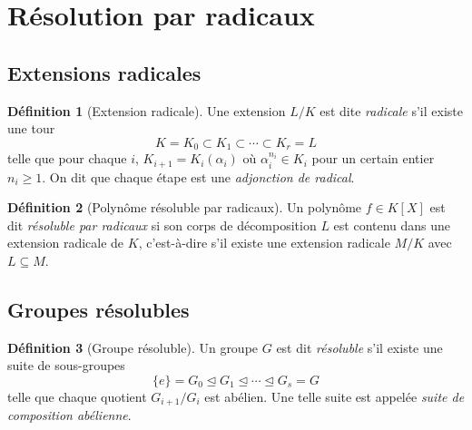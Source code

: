 \documentclass[12pt,a4paper,openany]{book}
\theoremstyle{definition}
\newtheorem{definition}{Définition}[chapter]
\begin{document}
\section{Résolution par radicaux}\label{sec:resolution-radicaux}

\subsection{Extensions radicales}\label{ssec:extensions-radicales}

\begin{definition}[Extension radicale]\label{def:extension-radicale}
Une extension $L/K$ est dite \emph{radicale} s'il existe une tour
\[
  K = K_0 \subset K_1 \subset \cdots \subset K_r = L
\]
telle que pour chaque $i$, $K_{i+1} = K_i(\alpha_i)$ où $\alpha_i^{n_i}
\in K_i$ pour un certain entier $n_i \geq 1$. On dit que chaque étape est
une \emph{adjonction de radical}.
\end{definition}

\begin{definition}[Polynôme résoluble par radicaux]\label{def:resoluble-radicaux}
Un polynôme $f \in K[X]$ est dit \emph{résoluble par radicaux} si son corps
de décomposition $L$ est contenu dans une extension radicale de $K$, c'est-à-dire
s'il existe une extension radicale $M/K$ avec $L \subseteq M$.
\end{definition}

\subsection{Groupes résolubles}\label{ssec:groupes-resolubles}

\begin{definition}[Groupe résoluble]\label{def:groupe-resoluble}
Un groupe $G$ est dit \emph{résoluble} s'il existe une suite de sous-groupes
\[
  \{e\} = G_0 \trianglelefteq G_1 \trianglelefteq \cdots \trianglelefteq
  G_s = G
\]
telle que chaque quotient $G_{i+1}/G_i$ est abélien. Une telle suite est
appelée \emph{suite de composition abélienne}.
\end{definition}
\end{document}
